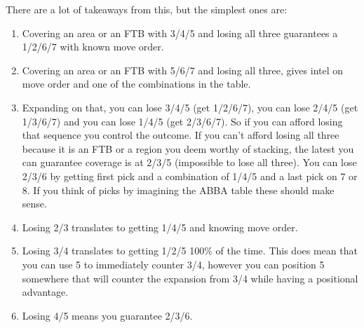 There are a lot of takeaways from this, but the simplest ones are:
\begin{enumerate}
    \item Covering an area or an FTB with 3/4/5 and losing all three guarantees a 1/2/6/7 with known move order.
    \item Covering  an area or an FTB with 5/6/7 and losing all three, gives intel on move order and one of the combinations in the table.
    \item Expanding on that, you can lose 3/4/5 (get 1/2/6/7), you can lose 2/4/5 (get 1/3/6/7) and you can lose 1/4/5 (get 2/3/6/7). So if you can afford losing that sequence you control the outcome. If you can't afford losing all three because it is an FTB or a region you deem worthy of stacking, the latest you can guarantee coverage is at 2/3/5 (impossible to lose all three). You can lose 2/3/6 by getting first pick and a combination of 1/4/5 and a last pick on 7 or 8. If you think of picks by imagining the ABBA table these should make sense.
    \item Losing 2/3 translates to getting 1/4/5 and knowing move order.
    \item Losing 3/4 translates to getting 1/2/5 100\% of the time. This does mean that you can use 5 to immediately counter 3/4, however you can position 5 somewhere that will counter the expansion from 3/4 while having a positional advantage.
    \item Losing 4/5 means you guarantee 2/3/6.
\end{enumerate}

